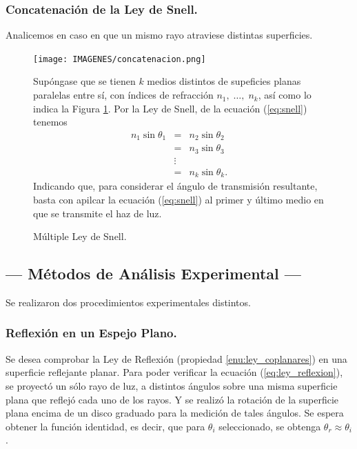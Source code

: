 \documentclass[12pt,a4paper]{article}
\begin{document}
\subsubsection{Concatenación de la Ley de Snell.} %
\label{subs:concatenacion}
Analicemos en caso en que un mismo rayo atraviese distintas superficies.
\begin{figure}[ht]
\begin{minipage}{0.3\linewidth}
	\texttt{[image: IMAGENES/concatenacion.png]}
	\caption{Múltiple Ley de Snell.}
	\label{fig:concatenacion}
\end{minipage}
\hspace{5mm}
\begin{minipage}{0.7\linewidth}
	Supóngase que se tienen \(k\) medios distintos de supeficies planas paralelas entre sí, con índices de refracción \(n_1, \;\ldots,\; n_k\), así como lo indica la Figura \ref{fig:concatenacion}. Por la Ley de Snell, de la ecuación (\ref{eq:snell}) tenemos
	\begin{equation}
		\begin{array}{rcl}
			n_1 \sin \theta _1 & = & n_2 \sin \theta _2 \\[2mm]
			& = & n_3 \sin \theta _3 \\[2mm]
			& \vdots & \\[2mm]
			& = & n_k \sin \theta _k .
		\end{array}
		\label{eq:multiple_snell}
	\end{equation}
	Indicando que, para considerar el ángulo de transmisión resultante, basta con apilcar la ecuación (\ref{eq:snell}) al primer y último medio en que se transmite el haz de luz.
\end{minipage}
\end{figure}


\newpage

\subsection{--- Métodos de Análisis Experimental ---} %
Se realizaron dos procedimientos experimentales distintos.

\subsubsection{Reflexión en un Espejo Plano.} %
\label{subs:reflexion_espejo}
Se desea comprobar la Ley de Reflexión (propiedad \ref{enu:ley_coplanares}) en una superficie reflejante planar.
Para poder verificar la ecuación (\ref{eq:ley_reflexion}), se proyectó un sólo rayo de luz, a distintos ángulos sobre una misma superficie plana que reflejó cada uno de los rayos. 
Y se realizó la rotación de la superficie plana encima de un disco graduado para la medición de tales ángulos.
Se espera obtener la función identidad, es decir, que para \(\theta _i\) seleccionado, se obtenga \(\theta _r \approx \theta _i\).
\end{document}
